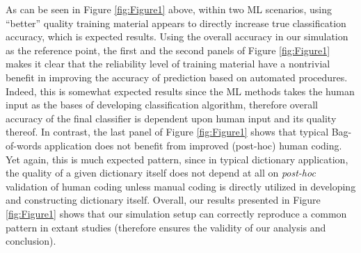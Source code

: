 \documentclass[man, 12pt, a4paper, nolmodern, noextraspace]{apa6}
\begin{document}
As can be seen in Figure \ref{fig:Figure1} above, within two ML scenarios, using \enquote{better} quality training material appears to directly increase true classification accuracy, which is expected results. Using the overall accuracy in our simulation as the reference point, the first and the second panels of Figure \ref{fig:Figure1} makes it clear that the reliability level of training material have a nontrivial benefit in improving the accuracy of prediction based on automated procedures. Indeed, this is somewhat expected results since the ML methods takes the human input as the bases of developing classification algorithm, therefore overall accuracy of the final classifier is dependent upon human input and its quality thereof. In contrast, the last panel of Figure \ref{fig:Figure1} shows that typical Bag-of-words application does not benefit from improved (post-hoc) human coding. Yet again, this is much expected pattern, since in typical dictionary application, the quality of a given dictionary itself does not depend at all on \textit{post-hoc} validation of human coding unless manual coding is directly utilized in developing and constructing dictionary itself. Overall, our results presented in Figure \ref{fig:Figure1} shows that our simulation setup can correctly reproduce a common pattern in extant studies (therefore ensures the validity of our analysis and conclusion).   
\end{document}
